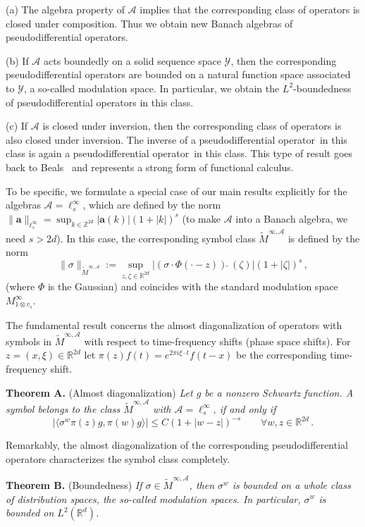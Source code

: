\documentclass[12pt]{amsart}
\theoremstyle{definition}
\theoremstyle{remark}
\numberwithin{equation}{section}
\newcommand{\tfs}{time-frequency shift}
\newcommand{\modsp}{modulation space}
\newcommand{\psdo}{pseudodifferential operator}
\newcommand{\symbo}{\widetilde M^{\infty, \cA}}
\def\cA{\mathcal{A}}
\def\cY{\mathcal{Y}}
\def\bR{{\mathbb{R}}}
\def\bZ{{\mathbb{Z}}}
\def\rd{\bR^d}
\def\rdd{{\bR^{2d}}}
\def\zdd{{\bZ^{2d}}}
\def\lrd{L^2(\rd)}
\def\cA{\mathcal{A}}
\newcommand{\fif}{if and only if}
\begin{document}
(a) The algebra property of $\cA $ implies that the corresponding 
class of operators is closed under composition. Thus we obtain new
Banach algebras of \psdo s.

(b) If $\cA $ acts boundedly on a solid sequence space $\cY $,
then the
corresponding \psdo s are bounded on a natural function space
associated to $\cY $, a so-called \modsp . In particular, we obtain
the $L^2$-boundedness of \psdo s in this class.  

(c) If $\cA $ is closed under inversion, then the corresponding class
of operators is also closed under inversion. The inverse of a \psdo\ in this
class is again a \psdo\ in this class. This type of result goes back
 to Beals~\cite{beals77} and represents a  strong form of functional calculus.


To be specific, we formulate a special case of  our  main results
explicitly for the 
algebras $\cA = \ell ^\infty _{s}$, which are  defined by the norm
$\|\mathbf{a}\|_{\ell ^\infty _s} = \sup _{k\in \zdd} |\mathbf{a}(k)| (1+|k|)^s
$  (to make $\cA $ into a Banach algebra, we need $s>2d$). In this
case, the corresponding symbol class $\symbo $ is defined by the norm 
\begin{equation}
  \label{eq:cu21}
\|\sigma \|_{\symbo} :=   \sup _{z,\zeta \in \rdd } |(\sigma \cdot
\Phi (\cdot - z) 
  )\,\widehat{}\, (\zeta ) | (1+|\zeta |)^s \, , 
\end{equation}
(where $\Phi$ is the Gaussian) and coincides with the standard \modsp\ $M^{\infty } _{1\otimes
  v_s}$. 

The fundamental result concerns the almost diagonalization of
operators with symbols in $\symbo$ with respect to \tfs s (phase space
shifts).  For $z= (x,\xi )\in \rdd $ let  $\pi (z) f(t) = e^{2\pi i
  \xi \cdot t} f(t-x)$  be the corresponding \tfs . 

\vspace{3 mm}

\textbf{Theorem A.} (Almost diagonalization) \emph{Let $g$ be a nonzero
Schwartz function.  A symbol belongs to the
class $\symbo $ with $\cA = \ell ^\infty _s$, \fif\ } 
$$
|\langle \sigma ^w \pi (z) g, \pi (w) g\rangle | \leq C (1+|w-z|)^{-s}
\qquad \forall w,z\in \rdd \, .
$$

Remarkably, the almost diagonalization of the corresponding \psdo s
characterizes the symbol class completely. 

\vspace{3 mm}

\textbf{Theorem B.} (Boundedness) \emph{If $\sigma \in \symbo$, then
  $\sigma ^w$ is bounded on a whole class of distribution spaces, the
  so-called \modsp s. In particular, $\sigma ^w$ is bounded on  $\lrd
  $.}
\end{document}

